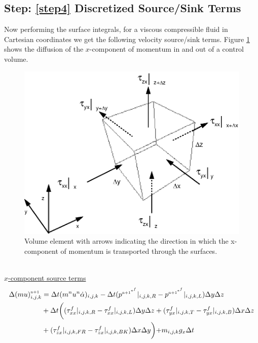 \documentclass[fleqn]{article}
\begin{document}
{\subsection{Step: \ref{step4} \textsf{Discretized Source/Sink Terms}}
Now performing the surface integrals, for a viscous compressible fluid
in Cartesian coordinates we get the following velocity source/sink terms.
Figure \ref{fig:vol_element} shows the diffusion of  the $x$-component of
momentum in and out of a control volume.
%
\begin{figure}
    \center
    \includegraphics[scale=.85]{vol_element.eps}
    \caption{Volume element with arrows indicating the direction in which the x-component of momentum is transported through the surfaces.}
    \label{fig:vol_element}
\end{figure}
%
\\
\underline{\textsf{$x$-component source terms}}\\
%
\begin{align*}
        \Delta{(m u)}^{\nadv}_{i,j,k}  &= 
        \delt( m^{n} u^n \dot{\alpha} )_{i,j,k}
-       \delt(   \pstar|_{i,j,k,R} - \pstar|_{i,j,k,L})\dely \delz\\
&   +   \delt\biggr(
    (   \tau^{f}_{xx}|_{i,j,k,R} - \tau^{f}_{xx}|_{i,j,k,L})\dely \delz
    +(  \tau^{f}_{yx}|_{i,j,k,T} - \tau^{f}_{yx}|_{i,j,k,B})\delx \delz\\
&   +(  \tau^{f}_{zx}|_{i,j,k,FR} - \tau^{f}_{zx}|_{i,j,k,BK})\delx \dely \biggl)
    +   m_{i,j,k}g_x\delt
\end{align*}
%
}
\end{document}
